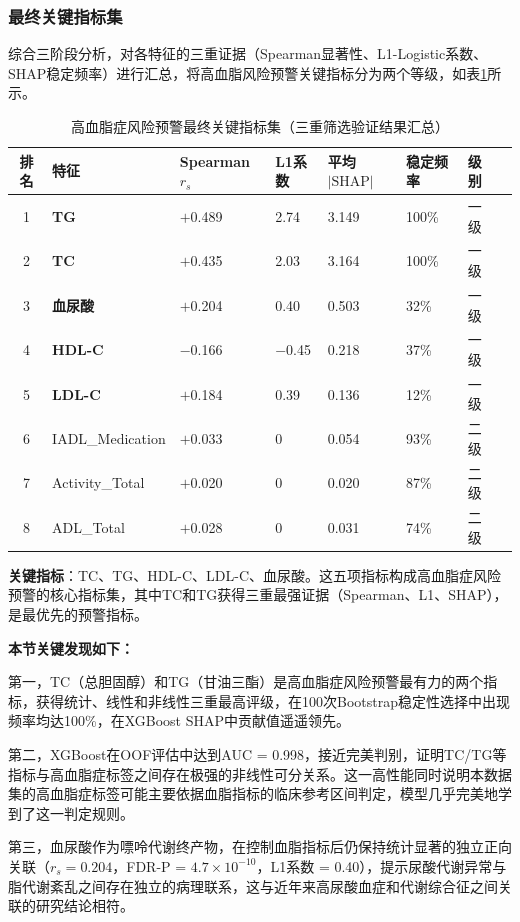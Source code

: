 \documentclass[12pt,a4paper]{ctexart}
\begin{document}
\subsubsection{最终关键指标集}
综合三阶段分析，对各特征的三重证据（Spearman显著性、L1-Logistic系数、SHAP稳定频率）进行汇总，将高血脂风险预警关键指标分为两个等级，如表\ref{tab:hld_final}所示。
\begin{table}[H]
\centering
\caption{高血脂症风险预警最终关键指标集（三重筛选验证结果汇总）}
\label{tab:hld_final}
\begin{tabular}{clllllll}
\toprule
排名 & 特征 & Spearman $r_s$ & L1系数 & 平均$|\text{SHAP}|$ & 稳定频率 & 级别 \\
\midrule
1 & \textbf{TG}     & $+$0.489 & 2.74  & 3.149 & 100\% & 一级 \\
2 & \textbf{TC}     & $+$0.435 &  2.03  & 3.164 & 100\% & 一级 \\
3 & \textbf{血尿酸} & $+$0.204 &   0.40  & 0.503 &  32\% & 一级 \\
4 & \textbf{HDL-C}  & $-$0.166 &  $-$0.45 & 0.218 & 37\% & 一级 \\
5 & \textbf{LDL-C}  & $+$0.184 &  0.39  & 0.136 &  12\% & 一级 \\
6 & IADL\_Medication & $+$0.033 &  0     & 0.054 &  93\% & 二级 \\
7 & Activity\_Total  & $+$0.020 &   0     & 0.020 &  87\% & 二级 \\
8 & ADL\_Total       & $+$0.028 &  0     & 0.031 &  74\% & 二级 \\
\bottomrule
\end{tabular}
\end{table}
\textbf{关键指标}：TC、TG、HDL-C、LDL-C、血尿酸。这五项指标构成高血脂症风险预警的核心指标集，其中TC和TG获得三重最强证据（Spearman、L1、SHAP），是最优先的预警指标。

\textbf{本节关键发现如下：}

第一，TC（总胆固醇）和TG（甘油三酯）是高血脂症风险预警最有力的两个指标，获得统计、线性和非线性三重最高评级，在100次Bootstrap稳定性选择中出现频率均达100\%，在XGBoost SHAP中贡献值遥遥领先。

第二，XGBoost在OOF评估中达到AUC = 0.998，接近完美判别，证明TC/TG等指标与高血脂症标签之间存在极强的非线性可分关系。这一高性能同时说明本数据集的高血脂症标签可能主要依据血脂指标的临床参考区间判定，模型几乎完美地学到了这一判定规则。

第三，血尿酸作为嘌呤代谢终产物，在控制血脂指标后仍保持统计显著的独立正向关联（$r_s = 0.204$，FDR-P = $4.7\times10^{-10}$，L1系数 = 0.40），提示尿酸代谢异常与脂代谢紊乱之间存在独立的病理联系，这与近年来高尿酸血症和代谢综合征之间关联的研究结论相符。
\end{document}
